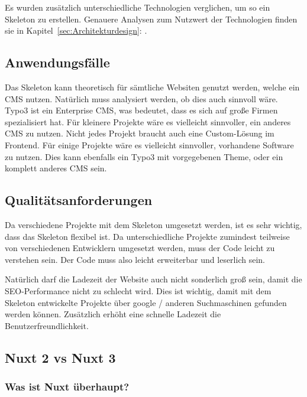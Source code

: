 Es wurden zusätzlich unterschiedliche Technologien verglichen, um so ein Skeleton zu erstellen. Genauere Analysen zum Nutzwert der Technologien finden sie in Kapitel~\ref{sec:Architekturdesign}: . 


\subsection{Anwendungsfälle}
\label{sec:Anwendungsfaelle}

Das Skeleton kann theoretisch für sämtliche Websiten genutzt werden, welche ein \acs{CMS} nutzen. Natürlich muss analysiert werden, ob dies auch sinnvoll wäre. Typo3 ist ein Enterprise \acs{CMS}, was bedeutet, dass es sich auf große Firmen spezialisiert hat. Für kleinere Projekte wäre es vielleicht sinnvoller, ein anderes \acs{CMS} zu nutzen. Nicht jedes Projekt braucht auch eine Custom-Lösung im Frontend. Für einige Projekte wäre es vielleicht sinnvoller, vorhandene Software zu nutzen. Dies kann ebenfalls ein Typo3 mit vorgegebenen Theme, oder ein komplett anderes \acs{CMS} sein.

\subsection{Qualitätsanforderungen}
\label{sec:Qualitaetsanforderungen}

Da verschiedene Projekte mit dem Skeleton umgesetzt werden, ist es sehr wichtig, dass das Skeleton flexibel ist. Da unterschiedliche Projekte zumindest teilweise von verschiedenen Entwicklern umgesetzt werden, muss der Code leicht zu verstehen sein. Der Code muss also leicht erweiterbar und leserlich sein.

Natürlich darf die Ladezeit der Website auch nicht sonderlich groß sein, damit die SEO-Performance nicht zu schlecht wird. Dies ist wichtig, damit mit dem Skeleton entwickelte Projekte über google / anderen Suchmaschinen gefunden werden können. Zusätzlich erhöht eine schnelle Ladezeit die Benutzerfreundlichkeit.

\subsection{Nuxt 2 vs Nuxt 3}
\label{sec:Nuxt 2 vs Nuxt 3}

\subsubsection{Was ist Nuxt überhaupt?}
\label{sec:Was ist Nuxt überhaupt?}

